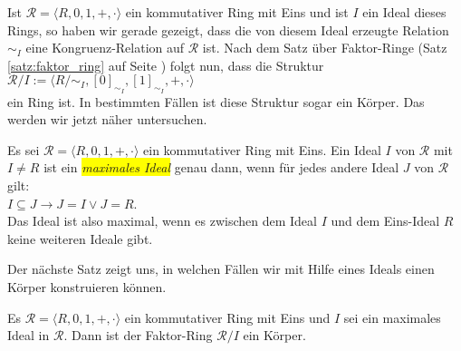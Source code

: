 Ist $\mathcal{R} = \langle R, 0, 1, +, \cdot \rangle$ ein kommutativer Ring mit Eins und ist $I$ ein
Ideal dieses Rings, so haben wir gerade gezeigt, dass die von diesem Ideal erzeugte Relation $\sim_I$
eine Kongruenz-Relation auf $\mathcal{R}$ ist.  Nach dem Satz \"{u}ber Faktor-Ringe
(Satz \ref{satz:faktor_ring} auf Seite \pageref{satz:faktor_ring}) folgt nun, dass die Struktur
\\[0.2cm]
\hspace*{1.3cm}
 $\mathcal{R}/I := \langle R/\!\sim_I, [0]_{\sim_I}, [1]_{\sim_I}, +, \cdot \rangle$
\\[0.2cm]
ein Ring ist.  In bestimmten F\"{a}llen ist diese Struktur sogar ein K\"{o}rper.  Das werden wir jetzt n\"{a}her
untersuchen.

\begin{Definition}
  Es sei $\mathcal{R} = \langle R, 0, 1, +, \cdot \rangle$ ein kommutativer Ring mit Eins.  Ein Ideal
  $I$ von $\mathcal{R}$ mit $I \not= R$ ist ein \colorbox{yellow}{\emph{maximales Ideal}} genau dann, wenn f\"{u}r jedes andere Ideal
  $J$ von $\mathcal{R}$ gilt:
  \\[0.2cm]
  \hspace*{1.3cm}
  $I \subseteq J \rightarrow J = I \vee J = R$.
  \\[0.2cm]
  Das Ideal ist also maximal, wenn es zwischen dem Ideal $I$ und dem Eins-Ideal $R$ keine 
  weiteren Ideale gibt.
  \eox
\end{Definition}

Der n\"{a}chste Satz zeigt uns, in welchen F\"{a}llen wir mit Hilfe eines Ideals einen K\"{o}rper konstruieren
k\"{o}nnen. 
\begin{Satz} \lb
  Es $\mathcal{R} = \langle R, 0, 1, +, \cdot \rangle$ ein kommutativer Ring mit Eins und
  $I$ sei ein maximales Ideal in $\mathcal{R}$.  Dann ist der Faktor-Ring
  $\mathcal{R}/I$ ein K\"{o}rper.
\end{Satz}

